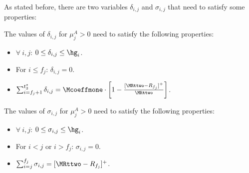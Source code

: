 As stated before, there are two variables $\delta_{i,j}$ and $\sigma_{i,j}$ that need to satisfy some properties:

\begin{property}\label{property:delta}
    The values of $\delta_{i,j}$ for $\mu_j^A>0$ need to satisfy the following properties:
    \begin{itemize}
        \item $\forall \ i, j$: $0 \le \delta_{i,j} \le \hg_i$.
        \item For $i\leq f_j$: $\delta_{i,j}=0$.
        \item $\sum_{i=f_j+1}^{t_3^\star} \delta_{i,j} = \Mcoeffmone \cdot \left[1 -\frac{[\MRttwo-R_{f_j}]^+}{\MRttwo}\right]$.
    \end{itemize}
\end{property}

\begin{property}\label{property:sigma}
    The values of $\sigma_{i,j}$ for $\mu_j^A>0$ need to satisfy the following properties:
    \begin{itemize}
        \item $\forall \ i, j$: $0 \le \sigma_{i,j} \le \hg_i$.
        \item For $i < j$ or $i > f_j$: $\sigma_{i,j}=0$.
        \item $\sum_{i=j}^{f_j} \sigma_{i,j} = [\MRttwo-R_{f_j}]^+$.
    \end{itemize}
\end{property}
